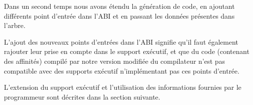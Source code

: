 Dans un second temps nous avons étendu la génération de code, en ajoutant différents point d'entrée dans l'ABI et en passant les données présentes dans l'arbre.

L'ajout des nouveaux points d'entrées dans l'ABI signifie qu'il faut également rajouter leur prise en compte dans le support exécutif, et que du code (contenant des affinités) compilé par notre version modifiée du compilateur n'est pas compatible avec des supports exécutif n'implémentant pas ces points d'entrée.


L'extension du support exécutif et l'utilisation des informations fournies par le programmeur sont décrites dans la section suivante.
